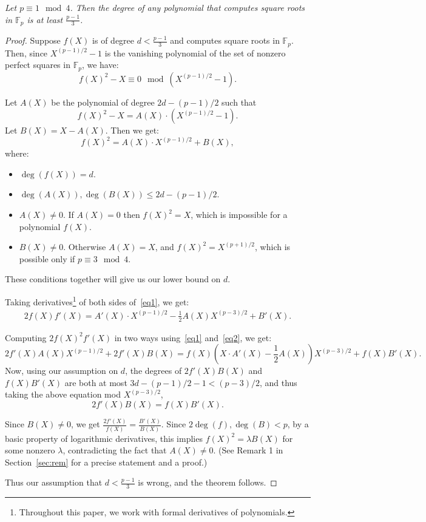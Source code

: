 \documentclass{article}
\newcommand{\F}{\mathbb{F}}
\begin{document}
{\em Let $p \equiv 1 \mod 4$. Then the degree of any polynomial that computes square roots in $\F_p$ is at least $\frac{p-1}{3}$.}
\begin{proof}
Suppose $f(X)$ is of degree $d < \frac{p-1}{3}$ and computes square roots in $\F_p$.
Then, since $X^{(p-1)/2} - 1$ is the vanishing polynomial of the set of nonzero perfect squares in $\F_p$, we have:
$$ f(X)^2 - X   \equiv 0  \mod (X^{(p-1)/2} - 1).$$

Let $A(X)$ be the polynomial of degree $2d-(p-1)/2$ such that
$$f(X)^2 - X =  A(X) \cdot (X^{(p-1)/2} - 1).$$
Let $B(X) = X - A(X)$.
Then we get:
\begin{equation}
\label{eq1}
f(X)^2 = A(X) \cdot X^{(p-1)/2}  + B(X),
\end{equation}
where:
\begin{itemize}
\item $\deg(f(X)) = d$.
 \item $\deg(A(X)), \deg(B(X)) \leq 2d - (p-1)/2$.
 \item $A(X) \neq 0$. If $A(X) = 0$ then $f(X)^2 = X$, which is impossible for a polynomial $f(X)$. 
 \item $B(X) \neq 0$. Otherwise $A(X) = X$, and $f(X)^2 = X^{(p+1)/2}$, which is possible only if $p \equiv 3 \mod 4$.
\end{itemize}

These conditions together will give us our lower bound on $d$.

Taking derivatives\footnote{Throughout this paper, we work with formal derivatives of polynomials.} of both sides of~\eqref{eq1}, we get:
\begin{align}
\label{eq2}
2f(X)f'(X) = A'(X) \cdot X^{(p-1)/2} - \frac{1}{2}A(X) X^{(p-3)/2} + B'(X).
\end{align}

Computing $2 f(X)^2 f'(X)$ in two ways using~\eqref{eq1} and~\eqref{eq2}, we get:
$$ 2 f'(X) A(X) X^{(p-1)/2} + 2 f'(X) B(X) = f(X) \left(X \cdot A'(X) - \frac{1}{2}A(X)\right) X^{(p-3)/2} + f(X) B'(X).$$
Now, using our assumption on $d$, the degrees of $2 f'(X)B(X)$ and $f(X) B'(X)$ are both at most
$3d - (p-1)/2 - 1 < (p-3)/2$, and thus taking the above equation mod $X^{(p-3)/2}$,
$$ 2f'(X) B(X) = f(X) B'(X).$$

Since $B(X) \neq 0$, we get $\frac{2 f'(X)}{f(X)} = \frac{B'(X)}{B(X)}$. Since $2\deg(f), \deg(B) < p$, by a basic property of logarithmic derivatives, this implies $f(X)^2 = \lambda B(X)$ for some nonzero $\lambda$, contradicting the fact that $A(X) \neq 0$. (See Remark 1 in Section~\ref{sec:rem} for a precise statement and a proof.)


Thus our assumption that $d < \frac{p-1}{3}$ is wrong, and the theorem follows.
\end{proof}
\end{document}
